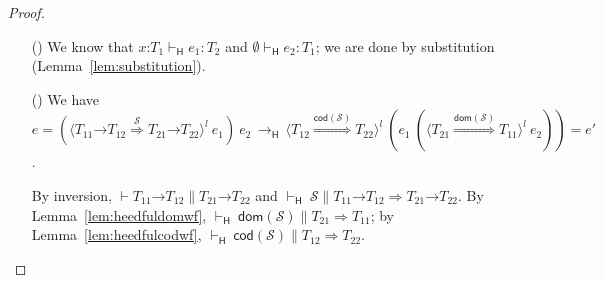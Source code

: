 \documentclass[9pt]{extarticle}
\newcommand{\ottnt}[1]{\mathit{#1}}
\begin{document}
{\begin{lemma}
\begin{proof}
{\begin{itemize}
\begin{itemize}
      \item[(\E{Beta})] We know that $  \mathit{x} \mathord{:} \ottnt{T_{{\mathrm{1}}}}    \vdash _{  \mathsf{H}  }  \ottnt{e_{{\mathrm{1}}}}  :  \ottnt{T_{{\mathrm{2}}}} $ and
        $ \emptyset   \vdash _{  \mathsf{H}  }  \ottnt{e_{{\mathrm{2}}}}  :  \ottnt{T_{{\mathrm{1}}}} $; we are done by substitution
        (Lemma~\ref{lem:substitution}).
      \item[(\E{Unwrap})] We have $\ottnt{e} =
          (  \langle   \ottnt{T_{{\mathrm{11}}}} \mathord{ \rightarrow } \ottnt{T_{{\mathrm{12}}}}   \mathord{ \overset{ \mathcal{S} }{\Rightarrow} }   \ottnt{T_{{\mathrm{21}}}} \mathord{ \rightarrow } \ottnt{T_{{\mathrm{22}}}}   \rangle^{ \ottnt{l} } ~  \ottnt{e_{{\mathrm{1}}}}  )  ~ \ottnt{e_{{\mathrm{2}}}}  \,  \longrightarrow _{  \mathsf{H}  }  \,  \langle  \ottnt{T_{{\mathrm{12}}}}  \mathord{ \overset{  \mathsf{cod} ( \mathcal{S} )  }{\Rightarrow} }  \ottnt{T_{{\mathrm{22}}}}  \rangle^{ \ottnt{l} } ~   (  \ottnt{e_{{\mathrm{1}}}} ~  (  \langle  \ottnt{T_{{\mathrm{21}}}}  \mathord{ \overset{  \mathsf{dom} ( \mathcal{S} )  }{\Rightarrow} }  \ottnt{T_{{\mathrm{11}}}}  \rangle^{ \ottnt{l} } ~  \ottnt{e_{{\mathrm{2}}}}  )   )   = \ottnt{e'}$.

        By inversion, $\vdash   \ottnt{T_{{\mathrm{11}}}} \mathord{ \rightarrow } \ottnt{T_{{\mathrm{12}}}}   \mathrel{\parallel}   \ottnt{T_{{\mathrm{21}}}} \mathord{ \rightarrow } \ottnt{T_{{\mathrm{22}}}} $ and $ \mathord{  \vdash _{  \mathsf{H}  } }~ \mathcal{S}   \mathrel{\parallel}    \ottnt{T_{{\mathrm{11}}}} \mathord{ \rightarrow } \ottnt{T_{{\mathrm{12}}}}   \Rightarrow   \ottnt{T_{{\mathrm{21}}}} \mathord{ \rightarrow } \ottnt{T_{{\mathrm{22}}}}  $. By Lemma~\ref{lem:heedfuldomwf},
        $ \mathord{  \vdash _{  \mathsf{H}  } }~  \mathsf{dom} ( \mathcal{S} )    \mathrel{\parallel}   \ottnt{T_{{\mathrm{21}}}}  \Rightarrow  \ottnt{T_{{\mathrm{11}}}} $; by
        Lemma~\ref{lem:heedfulcodwf}, $ \mathord{  \vdash _{  \mathsf{H}  } }~  \mathsf{cod} ( \mathcal{S} )    \mathrel{\parallel}   \ottnt{T_{{\mathrm{12}}}}  \Rightarrow  \ottnt{T_{{\mathrm{22}}}} $.
        

\end{itemize}
\end{itemize}}
\end{proof}
\end{lemma}}
\end{document}
